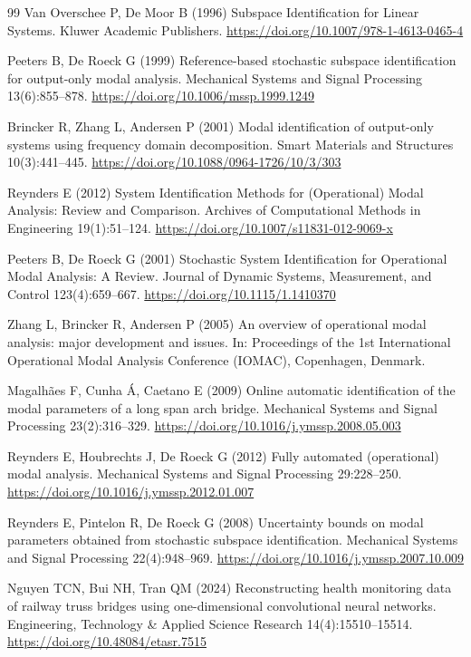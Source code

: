 \documentclass[11pt]{article}
\begin{document}
\begin{thebibliography}{99}
Van Overschee P, De Moor B (1996) Subspace Identification for Linear Systems. Kluwer Academic Publishers. \url{https://doi.org/10.1007/978-1-4613-0465-4}

Peeters B, De Roeck G (1999) Reference-based stochastic subspace identification for output-only modal analysis. Mechanical Systems and Signal Processing 13(6):855--878. \url{https://doi.org/10.1006/mssp.1999.1249}

Brincker R, Zhang L, Andersen P (2001) Modal identification of output-only systems using frequency domain decomposition. Smart Materials and Structures 10(3):441--445. \url{https://doi.org/10.1088/0964-1726/10/3/303}

Reynders E (2012) System Identification Methods for (Operational) Modal Analysis: Review and Comparison. Archives of Computational Methods in Engineering 19(1):51--124. \url{https://doi.org/10.1007/s11831-012-9069-x}

Peeters B, De Roeck G (2001) Stochastic System Identification for Operational Modal Analysis: A Review. Journal of Dynamic Systems, Measurement, and Control 123(4):659--667. \url{https://doi.org/10.1115/1.1410370}

Zhang L, Brincker R, Andersen P (2005) An overview of operational modal analysis: major development and issues. In: Proceedings of the 1st International Operational Modal Analysis Conference (IOMAC), Copenhagen, Denmark.

Magalh{\~a}es F, Cunha {\'A}, Caetano E (2009) Online automatic identification of the modal parameters of a long span arch bridge. Mechanical Systems and Signal Processing 23(2):316--329. \url{https://doi.org/10.1016/j.ymssp.2008.05.003}

Reynders E, Houbrechts J, De Roeck G (2012) Fully automated (operational) modal analysis. Mechanical Systems and Signal Processing 29:228--250. \url{https://doi.org/10.1016/j.ymssp.2012.01.007}

Reynders E, Pintelon R, De Roeck G (2008) Uncertainty bounds on modal parameters obtained from stochastic subspace identification. Mechanical Systems and Signal Processing 22(4):948--969. \url{https://doi.org/10.1016/j.ymssp.2007.10.009}

Nguyen TCN, Bui NH, Tran QM (2024) Reconstructing health monitoring data of railway truss bridges using one-dimensional convolutional neural networks. Engineering, Technology \& Applied Science Research 14(4):15510--15514. \url{https://doi.org/10.48084/etasr.7515}


\end{thebibliography}
\end{document}

